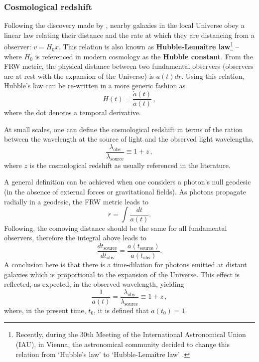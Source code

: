 \subsubsection{Cosmological redshift}
Following the discovery made by \cite{1929Hubble}, nearby galaxies in the local Universe obey a linear law relating their distance and the rate at which they are distancing from a observer: $v = H_0x$. This relation is also known as \textbf{Hubble-Lema\^itre law}\footnote{Recently, during the 30th Meeting of the International Astronomical Union (IAU), in Vienna, the astronomical community decided to change this relation from `Hubble's law' to `Hubble-Lemaître law' \citep{2018IAU-HubbleLemaitre}.} -- where $H_0$ is referenced in modern cosmology as the \textbf{Hubble constant}. From the FRW metric, the physical distance between two fundamental observers (observers are at rest with the expansion of the Universe) is $a(t)dr$. Using this relation, Hubble's law can be re-written in a more generic fashion as 
\begin{equation}
H(t) = \frac{\dot{a}(t)}{a(t)}\, ,
\end{equation}
where the dot denotes a temporal derivative. 

\qquad At small scales, one can define the cosmological redshift in terms of the ration between the wavelength at the source of light and the observed light wavelengths,
\begin{equation}
\frac{\lambda_{\text{obs}}}{\lambda_{\text{source}}}  \equiv 1 + z\, ,
\end{equation}
where $z$ is the cosmological redshift as usually referenced in the literature. 

\qquad A general definition can be achieved when one considers a photon's null geodesic (in the absence of external forces or gravitational fields). As photons propagate radially in a geodesic, the FRW metric leads to 
\begin{equation}
r = \int \frac{dt}{a(t)}.
\end{equation}
Following, the comoving distance should be the same for all fundamental observers, therefore the integral above leads to
\begin{equation}
\frac{dt_{\text{source}}}{dt_{\text{obs}}} = \frac{a(t_{\text{source}})}{a(t_{\text{obs}})}.
\end{equation}
A conclusion here is that there is a time-dilation for photons emitted at distant galaxies which is proportional to the expansion of the Universe. This effect is reflected, as expected, in the observed wavelength, yielding
\begin{equation}
\frac{1}{a(t)} = \frac{\lambda_{\text{obs}}}{\lambda_{\text{source}}}  \equiv 1 + z \, ,
\end{equation}
where, in the present time, $t_0$, it is defined that $a(t_0) = 1$. 

